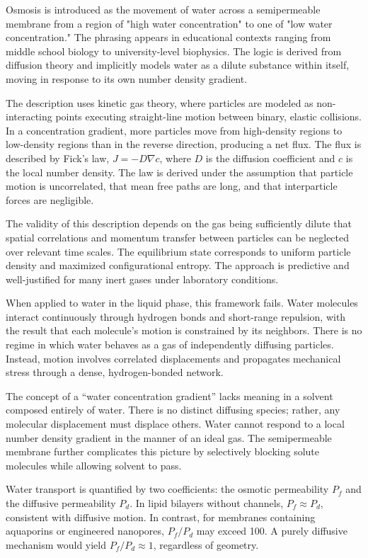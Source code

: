 Osmosis is introduced as the movement of water across a semipermeable membrane from a region of "high water concentration" to one of "low water concentration." The phrasing appears in educational contexts ranging from middle school biology to university-level biophysics. The logic is derived from diffusion theory and implicitly models water as a dilute substance within itself, moving in response to its own number density gradient.

The description uses kinetic gas theory, where particles are modeled as non-interacting points executing straight-line motion between binary, elastic collisions. In a concentration gradient, more particles move from high-density regions to low-density regions than in the reverse direction, producing a net flux. The flux is described by Fick's law, $J = -D \nabla c$, where $D$ is the diffusion coefficient and $c$ is the local number density. The law is derived under the assumption that particle motion is uncorrelated, that mean free paths are long, and that interparticle forces are negligible.

The validity of this description depends on the gas being sufficiently dilute that spatial correlations and momentum transfer between particles can be neglected over relevant time scales. The equilibrium state corresponds to uniform particle density and maximized configurational entropy. The approach is predictive and well-justified for many inert gases under laboratory conditions.

When applied to water in the liquid phase, this framework fails. Water molecules interact continuously through hydrogen bonds and short-range repulsion, with the result that each molecule’s motion is constrained by its neighbors. There is no regime in which water behaves as a gas of independently diffusing particles. Instead, motion involves correlated displacements and propagates mechanical stress through a dense, hydrogen-bonded network.

The concept of a “water concentration gradient” lacks meaning in a solvent composed entirely of water. There is no distinct diffusing species; rather, any molecular displacement must displace others. Water cannot respond to a local number density gradient in the manner of an ideal gas. The semipermeable membrane further complicates this picture by selectively blocking solute molecules while allowing solvent to pass.

Water transport is quantified by two coefficients: the osmotic permeability $P_f$ and the diffusive permeability $P_d$. In lipid bilayers without channels, $P_f \approx P_d$, consistent with diffusive motion. In contrast, for membranes containing aquaporins or engineered nanopores, $P_f / P_d$ may exceed 100. A purely diffusive mechanism would yield $P_f / P_d \approx 1$, regardless of geometry.

